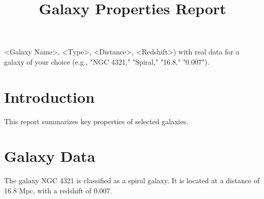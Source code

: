 \documentclass{article}
\title{Galaxy Properties Report}
\author{}
\date{}
\begin{document}
\maketitle

<Galaxy Name>, <Type>, <Distance>, <Redshift>) with real data for a galaxy of your choice (e.g., "NGC 4321," "Spiral," "16.8," "0.007").

\section{Introduction}
This report summarizes key properties of selected galaxies.

\section{Galaxy Data}
The galaxy NGC 4321 is classified as a spiral galaxy. 
It is located at a distance of 16.8 Mpc, with a redshift of 0.007.
\end{document}
